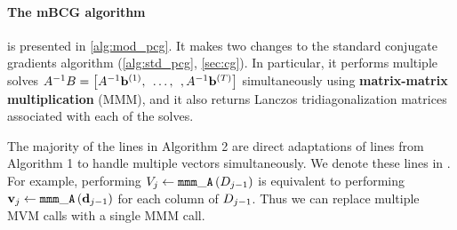 

\paragraph{The mBCG algorithm} is presented in \cref{alg:mod_pcg}.
It makes two changes to the standard conjugate gradients algorithm (\cref{alg:std_pcg}, \cref{sec:cg}).
In particular, it performs multiple solves $A^{-1} B = \left[ A^{-1} \mathbf{b}^{(1)}, \:\: \ldots, \:\:, A^{-1} \mathbf{b}^{(T)} \right]$
simultaneously using {\bf matrix-matrix multiplication} (MMM), and it also returns Lanczos tridiagonalization matrices associated with each of the solves.

The majority of the lines in Algorithm 2 are direct adaptations of lines from Algorithm 1 to handle multiple vectors simultaneously.
We denote these lines in {\color{\colormat} }.
For example, performing
%
$
  V_{j} \gets \mathtt{mmm\_A} \left( D_{j-1} \right)
$
%
is equivalent to performing $\mathbf{v}_{j} \gets \mathtt{mmm\_A} \left( \mathbf{d}_{j-1} \right)$ for each column of $D_{j-1}$.
Thus we can replace multiple MVM calls with a single MMM call.

